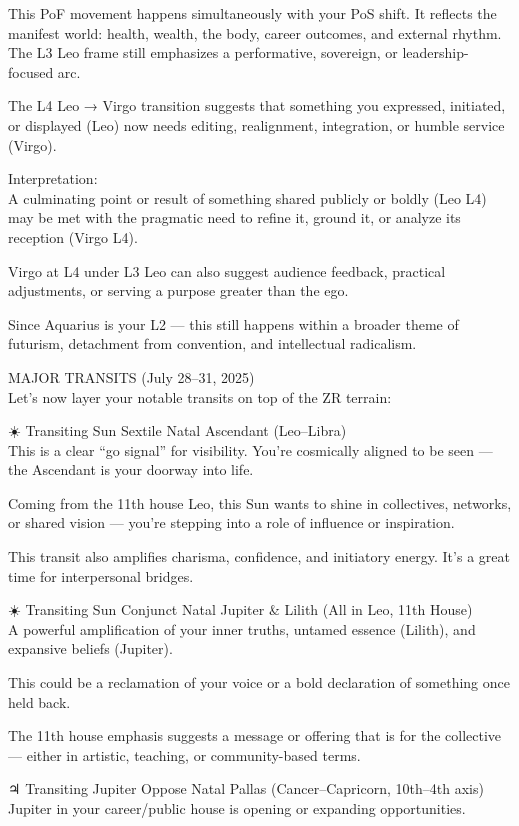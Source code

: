 \documentclass{article}
\begin{document}
This PoF movement happens simultaneously with your PoS shift. It reflects the manifest world: health, wealth, the body, career outcomes, and external rhythm.\\
The L3 Leo frame still emphasizes a performative, sovereign, or leadership-focused arc.

The L4 Leo → Virgo transition suggests that something you expressed, initiated, or displayed (Leo) now needs editing, realignment, integration, or humble service (Virgo).

Interpretation:\\
A culminating point or result of something shared publicly or boldly (Leo L4) may be met with the pragmatic need to refine it, ground it, or analyze its reception (Virgo L4).

Virgo at L4 under L3 Leo can also suggest audience feedback, practical adjustments, or serving a purpose greater than the ego.

Since Aquarius is your L2 --- this still happens within a broader theme of futurism, detachment from convention, and intellectual radicalism.

MAJOR TRANSITS (July 28--31, 2025)\\
Let's now layer your notable transits on top of the ZR terrain:

☀️ Transiting Sun Sextile Natal Ascendant (Leo--Libra)\\
This is a clear ``go signal'' for visibility. You're cosmically aligned to be seen --- the Ascendant is your doorway into life.

Coming from the 11th house Leo, this Sun wants to shine in collectives, networks, or shared vision --- you're stepping into a role of influence or inspiration.

This transit also amplifies charisma, confidence, and initiatory energy. It's a great time for interpersonal bridges.

☀️ Transiting Sun Conjunct Natal Jupiter \& Lilith (All in Leo, 11th House)\\
A powerful amplification of your inner truths, untamed essence (Lilith), and expansive beliefs (Jupiter).

This could be a reclamation of your voice or a bold declaration of something once held back.

The 11th house emphasis suggests a message or offering that is for the collective --- either in artistic, teaching, or community-based terms.

♃ Transiting Jupiter Oppose Natal Pallas (Cancer--Capricorn, 10th--4th axis)\\
Jupiter in your career/public house is opening or expanding opportunities.
\end{document}
